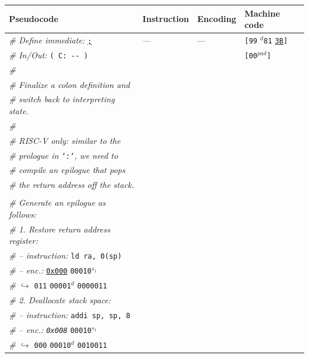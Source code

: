 \documentclass[a4paper,12pt,final]{article}
\begin{document}
\begin{table}[!htbp] \begin{adjustwidth}{-1cm}{-1cm} \fontsize{8}{9.600000}\selectfont
\begin{center}
\begin{tabular}{l|ll|l}
\textbf{Pseudocode} & \textbf{Instruction} & \textbf{Encoding} & \textbf{Machine code}\\[0pt]
\hline
\emph{\# Define immediate:} \uline{\texttt{;}} & --- & --- & \texttt{[99} \(^{d}\)​\texttt{81} \uline{\texttt{3B}}​\texttt{]}\\[0pt]
\emph{\# In/Out:} \texttt{( C: -​- )} &  &  & \texttt{[00}​\(^{pad}\)​\texttt{]}\\[0pt]
\emph{\#} &  &  & \\[0pt]
\emph{\# Finalize a colon definition and} &  &  & \\[0pt]
\emph{\# switch back to interpreting state.} &  &  & \\[0pt]
\emph{\#} &  &  & \\[0pt]
\emph{\# RISC-V only: similar to the} &  &  & \\[0pt]
\emph{\# prologue in \texttt{`:`}, we need to} &  &  & \\[0pt]
\emph{\# compile an epilogue that pops} &  &  & \\[0pt]
\emph{\# the return address off the stack.} &  &  & \\[0pt]
 &  &  & \\[0pt]
\emph{\# Generate an epilogue as follows:} &  &  & \\[0pt]
\emph{\# 1. Restore return address register:} &  &  & \\[0pt]
\emph{\# – instruction:} \texttt{ld ra, 0(sp)} &  &  & \\[0pt]
\emph{\# – enc.:} \uline{\texttt{0x000}} \texttt{00010}​\(^{s_{1}}\) &  &  & \\[0pt]
\emph{\#}\hspace{3.5em} \(\hookrightarrow\) \texttt{011} \texttt{00001}​\(^{d}\)  \texttt{0000011} &  &  & \\[0pt]
\emph{\# 2. Deallocate stack space:} &  &  & \\[0pt]
\emph{\# – instruction:} \texttt{addi sp, sp, 8} &  &  & \\[0pt]
\emph{\# – enc.:} \emph{\texttt{0x008}} \texttt{00010}​\(^{s_{1}}\) &  &  & \\[0pt]
\emph{\#}\hspace{3.5em} \(\hookrightarrow\) \texttt{000} \texttt{00010}​\(^{d}\)  \texttt{0010011} &  &  & \\[0pt]

\end{tabular}
\end{center}
\end{adjustwidth}
\end{table}
\end{document}
